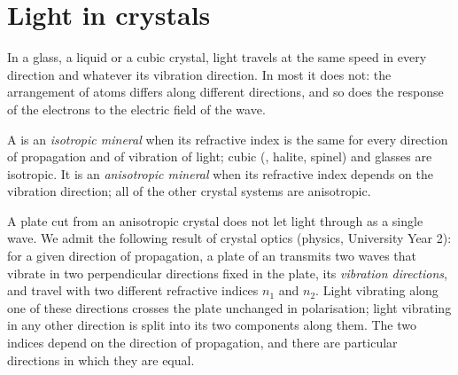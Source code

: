 \section{Light in crystals}

In a glass, a liquid or a cubic crystal, light travels at the same speed in
every direction and whatever its vibration direction. In most  it
does not: the arrangement of atoms differs along different directions, and so
does the response of the electrons to the electric field of the wave.

\begin{definition}\label{def:b1:optical-mineralogy:anisotropic}
A  is an \emph{isotropic mineral} when its
refractive index is the same for every direction of propagation and of
vibration of light; cubic  (, halite, spinel) and glasses are
isotropic. It is an \emph{anisotropic mineral}
when its refractive index depends on the vibration direction; all 
of the other crystal systems are anisotropic.
\end{definition}

A plate cut from an anisotropic crystal does not let light through as a single
wave. We admit the following result of crystal optics (physics, University
Year 2): for a given direction of propagation, a plate of an  transmits two waves that vibrate in two perpendicular directions fixed
in the plate, its \emph{vibration directions}, and travel with two different
refractive indices $n_1$ and $n_2$. Light vibrating along one of these
directions crosses the plate unchanged in polarisation; light vibrating in any
other direction is split into its two components along them. The two indices
depend on the direction of propagation, and there are particular directions
in which they are equal.

